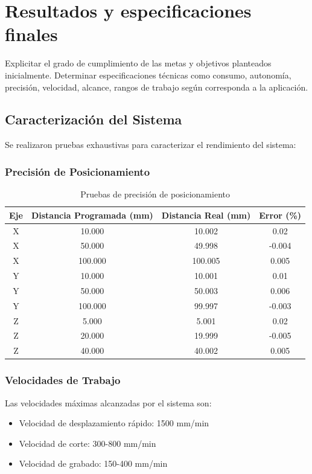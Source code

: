 \documentclass[12pt]{article}
\begin{document}
\section{Resultados y especificaciones finales}
Explicitar el grado de cumplimiento de las metas y objetivos planteados inicialmente.  
Determinar especificaciones técnicas como consumo, autonomía, precisión, velocidad, alcance, rangos de trabajo según corresponda a la aplicación.


\subsection{Caracterización del Sistema}

Se realizaron pruebas exhaustivas para caracterizar el rendimiento del sistema:

\subsubsection{Precisión de Posicionamiento}

\begin{table}[H]
\centering
\caption{Pruebas de precisión de posicionamiento}
\label{tab:precision}
\begin{tabular}{|c|c|c|c|}
\hline
\textbf{Eje} & \textbf{Distancia Programada (mm)} & \textbf{Distancia Real (mm)} & \textbf{Error (\%)} \\
\hline
X & 10.000 & 10.002 & 0.02 \\
X & 50.000 & 49.998 & -0.004 \\
X & 100.000 & 100.005 & 0.005 \\
\hline
Y & 10.000 & 10.001 & 0.01 \\
Y & 50.000 & 50.003 & 0.006 \\
Y & 100.000 & 99.997 & -0.003 \\
\hline
Z & 5.000 & 5.001 & 0.02 \\
Z & 20.000 & 19.999 & -0.005 \\
Z & 40.000 & 40.002 & 0.005 \\
\hline
\end{tabular}
\end{table}

\subsubsection{Velocidades de Trabajo}

Las velocidades máximas alcanzadas por el sistema son:
\begin{itemize}
    \item Velocidad de desplazamiento rápido: 1500 mm/min
    \item Velocidad de corte: 300-800 mm/min
    \item Velocidad de grabado: 150-400 mm/min
\end{itemize}
\end{document}
